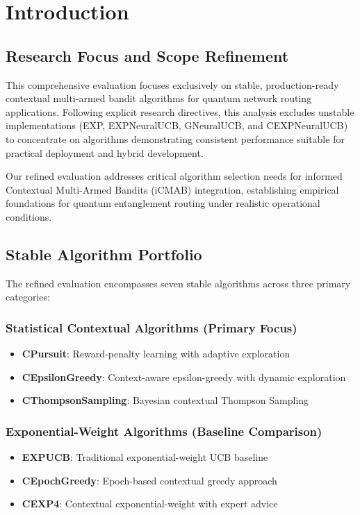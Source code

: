\documentclass[12pt,a4paper]{article}
\begin{document}
\section{Introduction}

\subsection{Research Focus and Scope Refinement}

This comprehensive evaluation focuses exclusively on stable, production-ready contextual multi-armed bandit algorithms for quantum network routing applications. Following explicit research directives, this analysis excludes unstable implementations (EXP, EXPNeuralUCB, GNeuralUCB, and CEXPNeuralUCB) to concentrate on algorithms demonstrating consistent performance suitable for practical deployment and hybrid development.

Our refined evaluation addresses critical algorithm selection needs for informed Contextual Multi-Armed Bandits (iCMAB) integration, establishing empirical foundations for quantum entanglement routing under realistic operational conditions.

\subsection{Stable Algorithm Portfolio}

The refined evaluation encompasses seven stable algorithms across three primary categories:

\subsubsection{Statistical Contextual Algorithms (Primary Focus)}
\begin{itemize}
\item \textbf{CPursuit}: Reward-penalty learning with adaptive exploration
\item \textbf{CEpsilonGreedy}: Context-aware epsilon-greedy with dynamic exploration
\item \textbf{CThompsonSampling}: Bayesian contextual Thompson Sampling
\end{itemize}

\subsubsection{Exponential-Weight Algorithms (Baseline Comparison)}
\begin{itemize}
\item \textbf{EXPUCB}: Traditional exponential-weight UCB baseline
\item \textbf{CEpochGreedy}: Epoch-based contextual greedy approach
\item \textbf{CEXP4}: Contextual exponential-weight with expert advice
\end{itemize}
\end{document}
